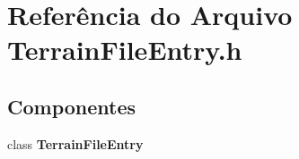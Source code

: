 \section{Referência do Arquivo Terrain\+File\+Entry.\+h}
\label{_terrain_file_entry_8h}
\subsection*{Componentes}
\begin{DoxyCompactItemize}
\item 
class {\bf Terrain\+File\+Entry}
\end{DoxyCompactItemize}
